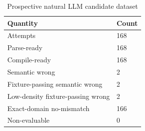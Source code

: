 \begin{table}[t]
\centering
\small
\caption{Prospective natural LLM candidate dataset}
\begin{tabular}{ll}
\toprule
Quantity & Count \\
\midrule
Attempts & 168 \\
Parse-ready & 168 \\
Compile-ready & 168 \\
Semantic wrong & 2 \\
Fixture-passing semantic wrong & 2 \\
Low-density fixture-passing wrong & 2 \\
Exact-domain no-mismatch & 166 \\
Non-evaluable & 0 \\
\bottomrule
\end{tabular}
\end{table}
